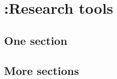 \chapter[Research tools]{{\color{red} :}Research tools}
%
\label{ch:metode}
%

\kant[4]

\section{One section}

\kant[5]

\section{More sections}

\kant[7-9]
